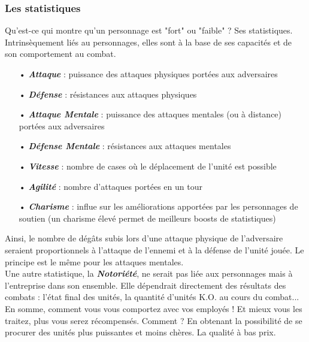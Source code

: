 \documentclass{article}
\begin{document}
\subsubsection{Les statistiques}
Qu'est-ce qui montre qu'un personnage est "fort" ou "faible" ? Ses statistiques. Intrinsèquement liés au personnages, elles sont à la base de ses capacités et de son comportement au combat.\\

\begin{itemize}
\item[•] \textbf{\textit{Attaque}} : puissance des attaques physiques portées aux adversaires\\
\item[•] \textbf{\textit{Défense}} : résistances aux attaques physiques\\
\item[•] \textbf{\textit{Attaque Mentale}} : puissance des attaques mentales (ou à distance) portées aux adversaires\\
\item[•] \textbf{\textit{Défense Mentale}} : résistances aux attaques mentales\\
\item[•] \textbf{\textit{Vitesse}} : nombre de cases où le déplacement de l'unité est possible\\
\item[•] \textbf{\textit{Agilité}} : nombre d'attaques portées en un tour\\
\item[•] \textbf{\textit{Charisme}} : influe sur les améliorations apportées par les personnages de soutien (un charisme élevé permet de meilleurs boosts de statistiques)\\
\end{itemize}

Ainsi, le nombre de dégâts subis lors d'une attaque physique de l'adversaire seraient proportionnels à l'attaque de l'ennemi et à la défense de l'unité jouée. Le principe est le même pour les attaques mentales.\\

Une autre statistique, la \textbf{\textit{Notoriété}}, ne serait pas liée aux personnages mais à l'entreprise dans son ensemble. Elle dépendrait directement des résultats des combats : l'état final des unités, la quantité d'unités K.O. au cours du combat...  En somme, comment vous vous comportez avec vos employés ! Et mieux vous les traitez, plus vous serez récompensés. Comment ? En obtenant la possibilité de se procurer des unités plus puissantes et moins chères. La qualité à bas prix.
\end{document}
